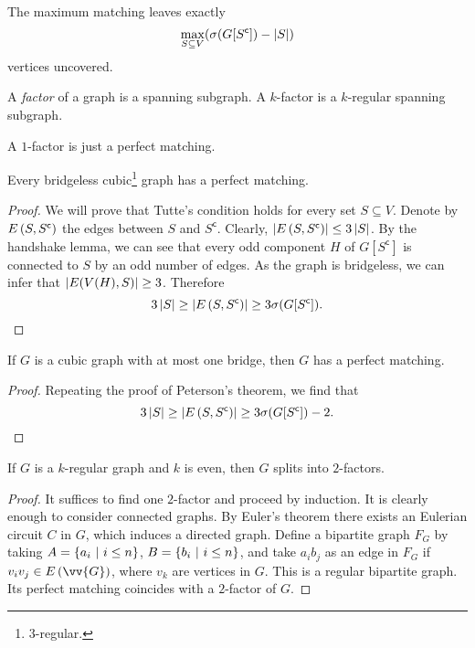 \begin{izrek}
The maximum matching leaves exactly
\[
\max_{S \subseteq V} (\sigma(G[S^{\mathsf{c}}]) - \left\lvert S\right\rvert)
\]
vertices uncovered.
\end{izrek}


\begin{definicija}
A \emph{factor} of a graph is a spanning subgraph. A
$k$-factor is a $k$-regular spanning subgraph.
\end{definicija}

\begin{opomba}
A $1$-factor is just a perfect matching.
\end{opomba}

\begin{izrek}[Peterson]
Every bridgeless cubic\footnote{$3$-regular.} graph has a perfect
matching.
\end{izrek}

\begin{proof}
We will prove that Tutte's condition holds for every set
$S \subseteq V$. Denote by $E \left(S, S^{\mathsf{c}}\right)$ the edges
between $S$ and $S^{\mathsf{c}}$. Clearly,
$\left\lvert E \left(S, S^{\mathsf{c}}\right)\right\rvert \leq 3 \left\lvert S\right\rvert$. By the handshake
lemma, we can see that every odd component $H$ of
$G[S^{\mathsf{c}}]$ is connected to $S$ by an odd number of edges.
As the graph is bridgeless, we can infer that
$\left\lvert E(V(H), S)\right\rvert \geq 3$. Therefore
\[
3 \left\lvert S\right\rvert \geq
\left\lvert E \left(S, S^{\mathsf{c}}\right)\right\rvert \geq
3 \sigma(G[S^{\mathsf{c}}]). \qedhere
\]
\end{proof}

\begin{izrek}
If $G$ is a cubic graph with at most one bridge, then $G$ has a
perfect matching.
\end{izrek}

\begin{proof}
Repeating the proof of Peterson's theorem, we find that
\[
3 \left\lvert S\right\rvert \geq
\left\lvert E \left(S, S^{\mathsf{c}}\right)\right\rvert \geq
3 \sigma(G[S^{\mathsf{c}}]) - 2. \qedhere
\]
\end{proof}

\begin{izrek}
If $G$ is a $k$-regular graph and $k$ is even, then $G$ splits into
$2$-factors.
\end{izrek}

\begin{proof}
It suffices to find one $2$-factor and proceed by induction. It is
clearly enough to consider connected graphs. By Euler's theorem
there exists an Eulerian circuit $C$ in $G$, which induces a
directed graph. Define a bipartite graph $F_G$ by taking
$A = \left\{a_i~\middle\vert~i \leq n\right\}$, $B = \left\{b_i~\middle\vert~i \leq n\right\}$, and take
$a_i b_j$ as an edge in $F_G$ if $v_i v_j \in E \br{\vv{G}}$, where
$v_k$ are vertices in $G$. This is a regular bipartite graph. Its
perfect matching coincides with a $2$-factor of $G$.
\end{proof}
